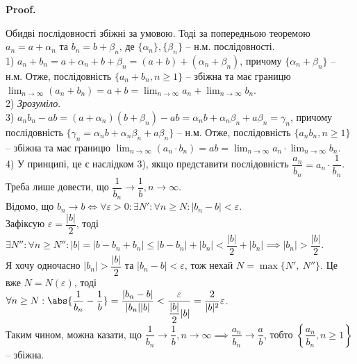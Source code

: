 \documentclass[a4paper, 14pt]{article}
\makeatletter
\def\qed{$\blacksquare$}
\theoremstyle{theoremdd}
\theoremstyle{theoremdd}
\theoremstyle{theoremdd}
\theoremstyle{theoremdd}
\theoremstyle{theoremdd}
\theoremstyle{theoremdd}
\theoremstyle{theoremdd}
\theoremstyle{theoremdd}
\renewenvironment{proof}[1][Proof.\\]{\par
\pushQED{\hfill \qed}%
\normalfont \topsep6\p@\@plus6\p@\relax
\trivlist
\item\relax
{\bfseries
#1\@addpunct{.}}\hspace\labelsep\ignorespaces
}{%
\popQED\endtrivlist\@endpefalse
}
\makeatother
\begin{document}
	\begin{proof}
	Обидві послідовності збіжні за умовою. Тоді за попередньою теоремою $a_n = a + \alpha_n$ та $b_n=b+\beta_n$, де $\{\alpha_n\}, \{\beta_n\}$ -- н.м. послідовності.\\
	1) $a_n+b_n=a+\alpha_n+b+\beta_n=(a+b)+(\alpha_n+\beta_n)$, причому $\{\alpha_n + \beta_n\}$ -- н.м. Отже, послідовність $\{a_n+b_n, n \geq 1\}$ -- збіжна та має границю $\displaystyle \lim_{n \to \infty} (a_n+b_n) = a+b = \lim_{n \to \infty} a_n+\lim_{n \to \infty} b_n$.
	\bigskip \\
	2) \textit{Зрозуміло}.
	\bigskip \\
	3) $a_n b_n - ab = (a+\alpha_n)(b+\beta_n) - ab = \alpha_n b + \alpha_n \beta_n + a \beta_n = \gamma_n$, причому послідовність $\{\gamma_n = \alpha_n b + \alpha_n \beta_n + a \beta_n \}$ -- н.м.  Отже, послідовність $\{a_n b_n, n \geq 1\}$ -- збіжна та має границю $\displaystyle \lim_{n \to \infty} (a_n \cdot b_n) = ab = \lim_{n \to \infty} a_n \cdot \lim_{n \to \infty} b_n$.
	\bigskip \\
	4) У принципі, це є наслідком 3), якщо представити послідовність $\dfrac{a_n}{b_n} = a_n \cdot \dfrac{1}{b_n}$. Треба лише довести, що $\dfrac{1}{b_n} \to \dfrac{1}{b}, n \to \infty$.\\
	Відомо, що $b_n \to b \iff \forall \varepsilon > 0: \exists N': \forall n \geq N: |b_n-b| < \varepsilon$.\\
	Зафіксую $\varepsilon = \dfrac{|b|}{2}$, тоді $\exists N'': \forall n \geq N'':  |b| = |b - b_n + b_n| \leq |b - b_n| + |b_n| < \dfrac{|b|}{2} + |b_n| \implies |b_n| > \dfrac{|b|}{2}$.\\
	Я хочу одночасно $|b_n| > \dfrac{|b|}{2}$ та $|b_n - b| < \varepsilon$, тож нехай $N = \max \{N', \ N'' \}$. Це вже $N = N(\varepsilon)$, тоді\\
	$\forall n \geq N: \abs{\dfrac{1}{b_n} - \dfrac{1}{b}} = \dfrac{|b_n -b|}{|b_n| |b|} < \dfrac{\varepsilon}{ \dfrac{|b|}{2} |b|} = \dfrac{2}{|b|^2} \varepsilon$.\\
	Таким чином, можна казати, що $\dfrac{1}{b_n} \to \dfrac{1}{b}, n \to \infty \implies \dfrac{a_n}{b_n} \to \dfrac{a}{b}$, тобто $\left\{ \dfrac{a_n}{b_n}, n \geq 1 \right\}$ -- збіжна.
	\end{proof}
	
\end{document}
